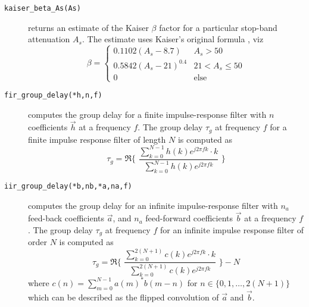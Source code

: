 \begin{description}
\item[{\tt kaiser\_beta\_As(As)}]
    returns an estimate of the Kaiser $\beta$ factor for a particular
    stop-band attenuation $A_s$.
    The estimate uses Kaiser's original formula \cite{Vaidyanathan:1993}, viz
    \begin{equation}
    \label{eqn:filter:firdes:misc:kaiser_beta}
        \beta =
        \begin{cases}
            0.1102 (A_s - 8.7)      &   A_s > 50 \\
            0.5842 (A_s - 21)^{0.4} &   21 < A_s \le 50 \\
            0                       &   \text{else}
        \end{cases}
    \end{equation}

\item[{\tt fir\_group\_delay(*h,n,f)}]
    computes the group delay for a finite impulse-response filter with
    $n$ coefficients $\vec{h}$ at a frequency $f$.
    The group delay $\tau_g$ at frequency $f$
    for a finite impulse response filter of length $N$
    is computed as
    \begin{equation}
    \label{eqn:filter:firdes:misc:fir_group_delay}
        \tau_g = \Re\Biggl\{ \,\,
            \frac{
                \sum_{k=0}^{N-1}{h(k)e^{j 2 \pi f k} \cdot k}
            } {
                \sum_{k=0}^{N-1}{h(k)e^{j 2 \pi f k}}
            }\,\,
            \Biggr\}
    \end{equation}

\item[{\tt iir\_group\_delay(*b,nb,*a,na,f)}]
    computes the group delay for an infinite impulse-response filter
    with $n_a$ feed-back coefficients $\vec{a}$,
    and $n_a$ feed-forward coefficients $\vec{b}$
    at a frequency $f$.
    The group delay $\tau_g$ at frequency $f$ for an infinite impulse
    response filter of order $N$ is computed as
    \begin{equation}
    \label{eqn:filter:firdes:misc:iir_group_delay}
        \tau_g = \Re\Biggl\{ \,\,
            \frac{
                \sum_{k=0}^{2(N+1)}{c(k)e^{j 2 \pi f k} \cdot k}
            } {
                \sum_{k=0}^{2(N+1)}{c(k)e^{j 2 \pi f k}}
            }\,\,
            \Biggr\}
            - N
    \end{equation}
    where $c(n) = \sum_{m=0}^{N-1}{a(m)^*b(m-n)}$
    for $n \in \{0,1,\ldots,2(N+1)\}$
    which can be described as the flipped convolution of $\vec{a}$ and
    $\vec{b}$.


\end{description}
